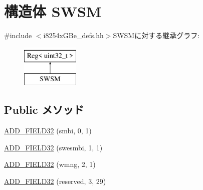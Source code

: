 \hypertarget{structiGbReg_1_1Regs_1_1SWSM}{
\section{構造体 SWSM}
\label{structiGbReg_1_1Regs_1_1SWSM}
}


{\ttfamily \#include $<$i8254xGBe\_\-defs.hh$>$}SWSMに対する継承グラフ:\begin{figure}[H]
\begin{center}
\leavevmode
\includegraphics[height=2cm]{structiGbReg_1_1Regs_1_1SWSM}
\end{center}
\end{figure}
\subsection*{Public メソッド}
\begin{DoxyCompactItemize}
\item 
\hyperlink{structiGbReg_1_1Regs_1_1SWSM_a94db8551b46f0f26933222471c278153}{ADD\_\-FIELD32} (smbi, 0, 1)
\item 
\hyperlink{structiGbReg_1_1Regs_1_1SWSM_ab69e67b64f141c346829140260eb652f}{ADD\_\-FIELD32} (swesmbi, 1, 1)
\item 
\hyperlink{structiGbReg_1_1Regs_1_1SWSM_a7cde12c6e9acfc4ba5315ae6b865db08}{ADD\_\-FIELD32} (wmng, 2, 1)
\item 
\hyperlink{structiGbReg_1_1Regs_1_1SWSM_aa8b8c0949aff16c9275a901c9d66476b}{ADD\_\-FIELD32} (reserved, 3, 29)
\end{DoxyCompactItemize}



